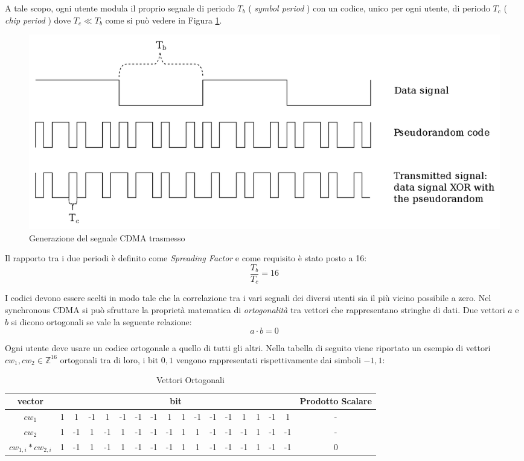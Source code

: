 \documentclass[a4paper,12pt]{article}
\begin{document}
    A tale scopo, ogni utente modula il proprio segnale di periodo $T_b$ ( \textit{symbol period} ) con un codice, unico
    per ogni utente, di periodo $T_c$ ( \textit{chip period} ) dove $T_c \ll T_b$ come si può vedere in Figura \ref{fig:Signals}.
    \begin{figure}[H]
      \centering
      \includegraphics[width=\textwidth]{img/Generation_of_CDMA.svg.png}
      \caption{Generazione del segnale CDMA trasmesso }
      \label{fig:Signals}
    \end{figure}

    Il rapporto tra i due periodi è definito come \textit{ Spreading Factor } e come requisito è stato posto a 16:
    $$ \frac{T_b}{T_c} = 16 $$

    I codici devono essere scelti in modo tale che la correlazione tra i vari segnali dei diversi utenti sia il più vicino
    possibile a zero. Nel synchronous CDMA si può sfruttare la proprietà matematica di \textit{ortogonalità} tra vettori 
    che rappresentano stringhe di dati. Due vettori $a$ e $b$ si dicono ortogonali  se vale la seguente relazione:
    $$ a \cdot b = 0 $$

    Ogni utente deve usare un codice ortogonale a quello di tutti gli altri. Nella tabella di seguito viene riportato
    un esempio di vettori $cw_1, cw_2 \in \mathbb{Z}^{16} $  ortogonali tra di loro, i bit $0, 1$ vengono rappresentati 
    rispettivamente dai simboli $-1, 1$:

    \begin{table}[H]
      \centering
      \begin{tabular}{| c | c | c | c | c | c | c | c | c | c | c | c | c | c | c | c | c | c |}\hline
        vector & \multicolumn{16}{|c|}{bit} & Prodotto Scalare \\ \hline
        \textbf{$cw_1$} &1&1&-1&1&-1&-1&-1&1&1&-1&-1&-1&1&1&-1&1& - \\ \hline
        \textbf{$cw_2$} &1&-1&1&-1&1&-1&-1&-1&1&1&-1&-1&-1&1&-1&-1& -\\ \hline
        \textbf{$cw_{1,i} * cw_{2,i}$} &1&-1&1&-1&1&-1&-1&-1&1&1&-1&-1&-1&1&-1&-1& 0 \\ \hline
      \end{tabular}
      \caption{Vettori Ortogonali}
      \label{tab:orthogonal vectors}
    \end{table}
\end{document}
